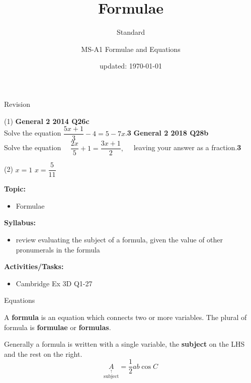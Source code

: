 \documentclass[aspectratio=169,10pt]{beamer}
\title{Formulae}
\subtitle{Standard}
\author{MS-A1 Formulae and Equations}
\date{updated: \today
}
\begin{document}
\begin{frame}{Revision}
\begin{tasks}(1)
    \task \textbf{General 2 2014 Q26c}\\
    Solve the equation $\dfrac{5x+1}{3}-4=5-7x$.\hfill\textbf{3}
    \task \textbf{General 2 2018 Q28b}\\
    Solve the equation $\quad\dfrac{2x}{5}+1=\dfrac{3x+1}{2},\quad$ leaving your answer as a fraction.\hfill\textbf{3}
\end{tasks}\vspace{7pt}\pause
  \begin{solution}[]
    \begin{tasks}(2)
    \task \pause$x=1$
    \task \pause$x=\dfrac{5}{11}$
    \end{tasks}
    \end{solution}
\end{frame}

\frame{\titlepage}

\begin{frame}
  \begin{outcome}
    \textbf{Topic:}
    \begin{itemize}
      \item[] Formulae
    \end{itemize}

    \textbf{Syllabus:}
    \begin{itemize}
      \item review evaluating the subject of a formula, given the value of other pronumerals in the formula
    \end{itemize}

    \textbf{Activities/Tasks:}
    \begin{itemize}
      \item Cambridge Ex 3D Q1-27
    \end{itemize}
  \end{outcome}
\end{frame}

\begin{frame}{Equations}
  \begin{definition}[]
    A \textbf{formula} is an equation which connects two or more variables. The plural of formula is \textbf{formulae} or \textbf{formulas}.
  \end{definition}\pause
  Generally a formula is written with a single variable, the \textbf{subject} on the LHS and the rest on the right.
  $$\underset{\overset{\uparrow}{\text{subject}}}{A}=\frac{1}{2}ab\cos{C}$$
\end{frame}
\end{document}
